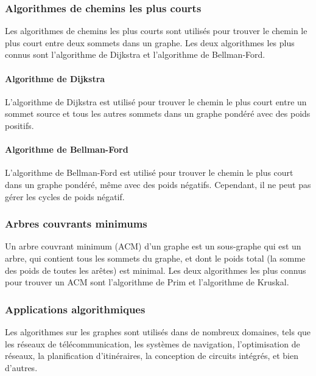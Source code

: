 
\subsubsection{Algorithmes de chemins les plus courts}
Les algorithmes de chemins les plus courts sont utilisés pour trouver le chemin le plus court entre deux sommets dans un graphe.
Les deux algorithmes les plus connus sont l'algorithme de Dijkstra et l'algorithme de Bellman-Ford.

\paragraph{Algorithme de Dijkstra}
L'algorithme de Dijkstra est utilisé pour trouver le chemin le plus court entre un sommet source et tous les autres sommets dans un graphe pondéré avec des poids positifs.

\paragraph{Algorithme de Bellman-Ford}
L'algorithme de Bellman-Ford est utilisé pour trouver le chemin le plus court dans un graphe pondéré, même avec des poids négatifs.
Cependant, il ne peut pas gérer les cycles de poids négatif.

\subsubsection{Arbres couvrants minimums}
Un arbre couvrant minimum (ACM) d'un graphe est un sous-graphe qui est un arbre, qui contient tous les sommets du graphe, et dont le poids total (la somme des poids de toutes les arêtes) est minimal.
Les deux algorithmes les plus connus pour trouver un ACM sont l'algorithme de Prim et l'algorithme de Kruskal.

\subsubsection{Applications algorithmiques}
Les algorithmes sur les graphes sont utilisés dans de nombreux domaines, tels que les réseaux de télécommunication, les systèmes de navigation, l'optimisation de réseaux, la planification d'itinéraires, la conception de circuits intégrés, et bien d'autres.

\newpage